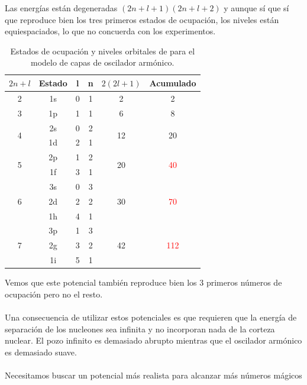 Las energías están degeneradas $(2n+l+1)(2n+l+2)$ y aunque sí que sí que reproduce bien los tres primeros estados de ocupación, los niveles están equiespaciados, lo que no concuerda con los experimentos.

\begin{table}[h]
\centering
\begin{tabular}{|cccccc|}
\hline
$2n+l$             & Estado & l & n & $2(2l+1)$           & Acumulado                            \\ \hline \hline
2                  & 1s     & 0 & 1 & 2                   & \textcolor{applegreen}{2}            \\ \hline
3                  & 1p     & 1 & 1 & 6                   & \textcolor{applegreen}{8}            \\ \hline
\multirow{2}{*}{4} & 2s & 0 & 2 & \multirow{2}{*}{12} & \multirow{2}{*}{\textcolor{applegreen}{20}} \\
                   & 1d     & 2 & 1 &                     &                                      \\ \hline
\multirow{2}{*}{5} & 2p     & 1 & 2 & \multirow{2}{*}{20} & \multirow{2}{*}{\textcolor{red}{40}} \\
                   & 1f     & 3 & 1 &                     &                                      \\ \hline
\multirow{3}{*}{6} & 3s     & 0 & 3 & \multirow{3}{*}{30} & \multirow{3}{*}{\textcolor{red}{70}} \\
                   & 2d     & 2 & 2 &                     &                                      \\
                   & 1h     & 4 & 1 &                     &                                      \\ \hline
\multirow{3}{*}{7} & 3p & 1 & 3 & \multirow{3}{*}{42} & \multirow{3}{*}{\textcolor{red}{112}}       \\
                   & 2g     & 3 & 2 &                     &                                      \\
                   & 1i     & 5 & 1 &                     &                                      \\ \hline
\end{tabular}
\caption{Estados de ocupación y niveles orbitales de para el modelo de capas de oscilador armónico.}
\label{tab: ocupacion oscilador armonico}
\end{table}

Vemos que este potencial también reproduce bien los 3 primeros números de ocupación pero no el resto.\\\\
Una consecuencia de utilizar estos potenciales es que requieren que la energía de separación de los nucleones sea infinita y no incorporan nada de la corteza nuclear. El pozo infinito es demasiado abrupto mientras que el oscilador armónico es demasiado suave.\\\\
Necesitamos buscar un potencial más realista para alcanzar más números mágicos \newpage
